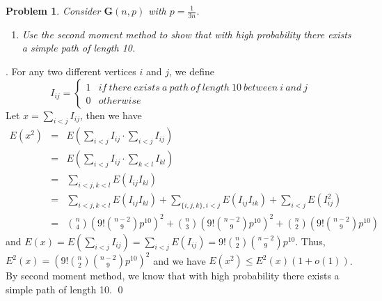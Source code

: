 \documentclass[12pt]{article}
\newtheorem{hw}{Problem}
\newenvironment{sol}
  {\par\vspace{3mm}\noindent{\it Solution}.}
  {\qed}
\begin{document}
\begin{hw}
Consider $\mathbf{G}(n,p)$ with $p=\frac{1}{3n}$.
\begin{enumerate}
  \item Use the second moment method to show that with high probability there exists a simple path of length 10.
\end{enumerate}
\end{hw}
\begin{sol}
	For any two different vertices $i$ and $j$, we define
	\begin{displaymath}
		I_{ij} = \left\{
			\begin{array}{ll}
			1 & if\ there\ exists\ a\ path\ of\ length\ 10\ between\ i\ and\ j \\
			0 & otherwise
			\end{array}
		\right.
	\end{displaymath}
	Let $x = \sum_{i < j}I_{ij}$, then we have
	\begin{displaymath}
	\begin{array}{lcl}
		E(x^{2}) & = & E(\sum_{i < j}I_{ij} \cdot \sum_{i < j}I_{ij}) \\
				 & = & E(\sum_{i < j}I_{ij} \cdot \sum_{k < l}I_{kl}) \\
				 & = & \sum_{i < j,k < l}E(I_{ij}I_{kl}) \\
				 & = & \sum_{i < j,k < l}E(I_{ij}I_{kl}) + \sum_{\{i,j,k\},i<j}E(I_{ij}I_{ik}) + \sum_{i < j}E(I_{ij}^{2}) \\
				 & = & {n \choose 4}\left( 9! {n-2 \choose 9} p^{10}\right)^{2} + {n \choose 3}\left( 9! {n-2 \choose 9} p^{10}\right)^{2} + {n \choose 2}\left( 9! {n-2 \choose 9} p^{10}\right)
	\end{array}
	\end{displaymath}
	and $E(x)= E(\sum_{i < j}I_{ij}) = \sum_{i < j}E(I_{ij}) = 9! {n \choose 2}{n-2 \choose 9} p^{10}$. Thus, $E^{2}(x)= \left( 9! {n \choose 2}{n-2 \choose 9} p^{10}\right)^{2}$ and we have $E(x^{2}) \le E^{2}(x)(1+o(1))$. By second moment method, we know that with high probability there exists a simple path of length 10.
\end{sol}
\end{document}
